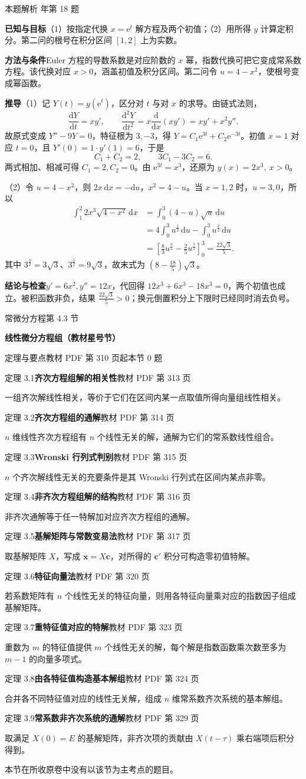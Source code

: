 \documentclass[UTF8,zihao=-4,fontset=fandol]{ctexart}
\newcommand{\SectionHeading}[4]{%
  \clearpage\hypertarget{sec-#1}{}%
  {\small\textcolor{accent}{#2\hfill 第 #1 节}}\par\medskip
  {\LARGE\bfseries #3}\par\smallskip
  {\small\textcolor{muted}{#4}}\par\bigskip}
\newcommand{\Theory}[4]{%
  {\small\textcolor{accent}{#1}\quad\textbf{#3}\hfill\textcolor{muted}{教材 PDF 第 #2 页}}\par
  {\small #4}\par\smallskip}
\newenvironment{QuestionSolution}[1]{%
  \clearpage
  {\small\textcolor{black!60}{本题解析\quad #1}}\par\medskip
}{\par\clearpage}
\begin{document}
\begin{QuestionSolution}{2024 年第 18 题}
\textbf{已知与目标}\quad （1）按指定代换 \(x=\mathrm{e}^t\) 解方程及两个初值；（2）用所得 \(y\) 计算定积分。第二问的根号在积分区间 \([1,2]\) 上为实数。

\textbf{方法与条件}\quad Euler 方程的导数系数是对应阶数的 \(x\) 幂，指数代换可把它变成常系数方程。该代换对应 \(x>0\)，涵盖初值及积分区间。第二问令 \(u=4-x^2\)，使根号变成幂函数。

\textbf{推导}\quad （1）记 \(Y(t)=y(\mathrm{e}^t)\)，区分对 \(t\) 与对 \(x\) 的求导。由链式法则，
\[
\frac{\mathrm{d}Y}{\mathrm{d}t}=xy',\qquad
\frac{\mathrm{d}^2Y}{\mathrm{d}t^2}=x\frac{\mathrm{d}}{\mathrm{d}x}(xy')=xy'+x^2y''.
\]
故原式变成 \(Y''-9Y=0\)，特征根为 \(3,-3\)，得 \(Y=C_1\mathrm{e}^{3t}+C_2\mathrm{e}^{-3t}\)。初值 \(x=1\) 对应 \(t=0\)，且 \(Y'(0)=1\cdot y'(1)=6\)，于是
\[
C_1+C_2=2,\qquad 3C_1-3C_2=6.
\]
两式相加、相减可得 \(C_1=2,C_2=0\)。由 \(\mathrm{e}^{3t}=x^3\)，还原为 \(\boxed{y(x)=2x^3,\ x>0}\)。

（2）令 \(u=4-x^2\)，则 \(2x\,\mathrm{d}x=-\mathrm{d}u\)，\(x^2=4-u\)。当 \(x=1,2\) 时，\(u=3,0\)，所以
\[
\begin{aligned}
\int_1^2 2x^3\sqrt{4-x^2}\,\mathrm{d}x
&=\int_0^3 (4-u)\sqrt{u}\,\mathrm{d}u\\
&=4\int_0^3u^{\frac{1}{2}}\,\mathrm{d}u-\int_0^3u^{\frac{3}{2}}\,\mathrm{d}u\\
&=\left[\frac{8}{3}u^{\frac{3}{2}}-\frac{2}{5}u^{\frac{5}{2}}\right]_0^3
=\boxed{\frac{22\sqrt3}{5}}.
\end{aligned}
\]
其中 \(3^{\frac{3}{2}}=3\sqrt{3}\)、\(3^{\frac{5}{2}}=9\sqrt{3}\)，故末式为 \((8-\frac{18}{5})\sqrt{3}\)。

\textbf{结论与检查}\quad \(y'=6x^2,y''=12x\)，代回得 \(12x^3+6x^3-18x^3=0\)，两个初值也成立。被积函数非负，结果 \(\frac{22\sqrt{3}}{5}>0\)；换元倒置积分上下限时已经同时消去负号。
\end{QuestionSolution}

\SectionHeading{4.3}{常微分方程}{线性微分方程组（教材星号节）}{定理与要点\quad 教材 PDF 第 310 页起\hfill 本节 0 题}
\Theory{定理 3.1}{313}{齐次方程组解的相关性}{一组齐次解线性相关，等价于它们在区间内某一点取值所得向量组线性相关。}
\Theory{定理 3.2}{314}{齐次方程组的通解}{\(n\) 维线性齐次方程组有 \(n\) 个线性无关的解，通解为它们的常系数线性组合。}
\Theory{定理 3.3}{315}{Wronski 行列式判别}{\(n\) 个齐次解线性无关的充要条件是其 Wronski 行列式在区间内某点非零。}
\Theory{定理 3.4}{316}{非齐次方程组解的结构}{非齐次通解等于任一特解加对应齐次方程组的通解。}
\Theory{定理 3.5}{317}{基解矩阵与常数变易法}{取基解矩阵 \(X\)，写成 \(\boldsymbol{x}=X\boldsymbol{c}\)，对所得的 \(\boldsymbol{c}'\) 积分可构造零初值特解。}
\Theory{定理 3.6}{320}{特征向量法}{若系数矩阵有 \(n\) 个线性无关的特征向量，则用各特征向量乘对应的指数因子组成基解矩阵。}
\Theory{定理 3.7}{323}{重特征值对应的特解}{重数为 \(m\) 的特征值提供 \(m\) 个线性无关的解，每个解是指数函数乘次数至多为 \(m-1\) 的向量多项式。}
\Theory{定理 3.8}{324}{由各特征值构造基本解组}{合并各不同特征值对应的线性无关解，组成 \(n\) 维常系数齐次系统的基本解组。}
\Theory{定理 3.9}{329}{常系数非齐次系统的通解}{取满足 \(X(0)=E\) 的基解矩阵，非齐次项的贡献由 \(X(t-\tau)\) 乘右端项后积分得到。}
本节在所收原卷中没有以该节为主考点的题目。
\end{document}
